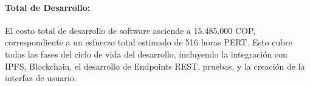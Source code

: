 \paragraph{Total de Desarrollo:} El costo total de desarrollo de software asciende a 15.485.000 COP, correspondiente a un esfuerzo total estimado de 516 horas PERT. Esto cubre todas las fases del ciclo de vida del desarrollo, incluyendo la integración con IPFS, Blockchain, el desarrollo de Endpoints REST, pruebas, y la creación de la interfaz de usuario. 